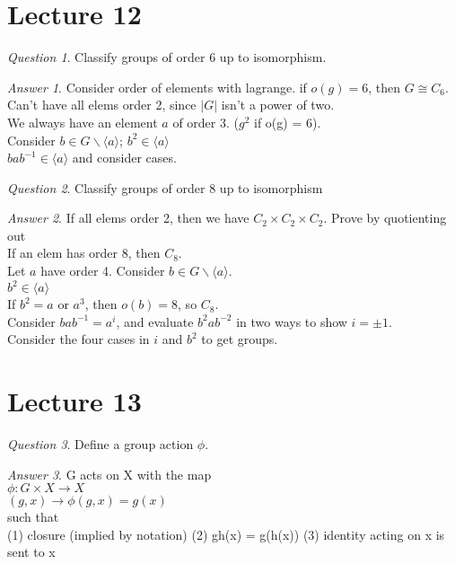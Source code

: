\documentclass[]{article}
\theoremstyle{remark}
\theoremstyle{qnstyle}
\newtheorem{question}{Question}
\theoremstyle{answerstyle}
\newtheorem*{answer}{Answer}
\begin{document}
\section* {Lecture 12}
{
    \begin{question}
        Classify groups of order 6 up to isomorphism.
    \end{question}
    \begin{answer}
        Consider order of elements with lagrange. if $o(g) = 6$, then $G \cong C_6$.\\
        Can't have all elems order 2, since $|G|$ isn't a power of two.\\
        We always have an element $a$ of order 3. ($g^2$ if o(g) = 6).\\
        Consider $b \in G \backslash \langle a \rangle$; $b^2 \in \langle a \rangle$ \\
        $bab^{-1} \in \langle a \rangle$ and consider cases.
    \end{answer}
}

{
    \begin{question}
        Classify groups of order 8 up to isomorphism
    \end{question}
    \begin{answer}
        If all elems order 2, then we have $C_2 \times C_2 \times C_2$. Prove by quotienting out\\
        If an elem has order 8, then $C_8$.\\
        Let $a$ have order 4. Consider $b \in G \backslash \langle a \rangle$.\\
        $b^2 \in \langle a \rangle$\\
        If $b^2 = a$ or $a^3$, then $o(b) = 8$, so $C_8$.\\
        Consider $bab^{-1} = a^{i}$, and evaluate $b^2 a b^{-2}$ in two ways to show $i = \pm 1$.\\
        Consider the four cases in $i$ and $b^2$ to get groups.
    \end{answer}
}

\section*{Lecture 13}
{
    \begin{question}
        Define a group action $\phi$.
    \end{question}
    \begin{answer}
        G acts on X with the map\\
        $\phi: G \times X \to X$\\
        $(g, x) \to \phi(g,x) = g(x)$ \\
        such that \\
        (1) closure (implied by notation)
        (2) gh(x) = g(h(x))
        (3) identity acting on x is sent to x
    \end{answer}
}
\end{document}
